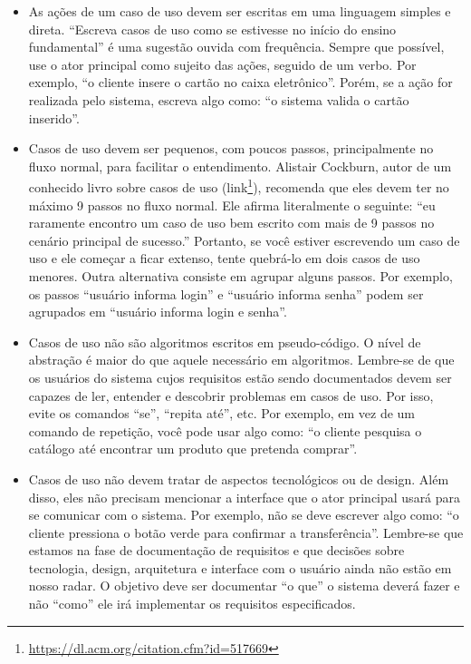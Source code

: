 \documentclass[
  11pt,
  twoside]{book}
\DeclareRobustCommand{\href}[2]{#2\footnote{\url{#1}}}
\begin{document}
\begin{itemize}
\item
  As ações de um caso de uso devem ser escritas em uma linguagem simples
  e direta. ``Escreva casos de uso como se estivesse no início do ensino
  fundamental'' é uma sugestão ouvida com frequência. Sempre que
  possível, use o ator principal como sujeito das ações, seguido de um
  verbo. Por exemplo, ``o cliente insere o cartão no caixa eletrônico''.
  Porém, se a ação for realizada pelo sistema, escreva algo como: ``o
  sistema valida o cartão inserido''.
\item
  Casos de uso devem ser pequenos, com poucos passos, principalmente no
  fluxo normal, para facilitar o entendimento. Alistair Cockburn,
   autor de um conhecido livro sobre casos de
  uso (\href{https://dl.acm.org/citation.cfm?id=517669}{link}),
  recomenda que eles devem ter no máximo 9 passos no fluxo normal. Ele
  afirma literalmente o seguinte: ``eu raramente encontro um caso de uso
  bem escrito com mais de 9 passos no cenário principal de sucesso.''
  Portanto, se você estiver escrevendo um caso de uso e ele começar a
  ficar extenso, tente quebrá-lo em dois casos de uso menores. Outra
  alternativa consiste em agrupar alguns passos. Por exemplo, os passos
  ``usuário informa login'' e ``usuário informa senha'' podem ser
  agrupados em ``usuário informa login e senha''.
\item
  Casos de uso não são algoritmos escritos em pseudo-código. O nível de
  abstração é maior do que aquele necessário em algoritmos. Lembre-se de
  que os usuários do sistema cujos requisitos estão sendo documentados
  devem ser capazes de ler, entender e descobrir problemas em casos de
  uso. Por isso, evite os comandos ``se'', ``repita até'', etc. Por
  exemplo, em vez de um comando de repetição, você pode usar algo como:
  ``o cliente pesquisa o catálogo até encontrar um produto que pretenda
  comprar''.
\item
  Casos de uso não devem tratar de aspectos tecnológicos ou de design.
  Além disso, eles não precisam mencionar a interface que o ator
  principal usará para se comunicar com o sistema. Por exemplo, não se
  deve escrever algo como: ``o cliente pressiona o botão verde para
  confirmar a transferência''. Lembre-se que estamos na fase de
  documentação de requisitos e que decisões sobre tecnologia, design,
  arquitetura e interface com o usuário ainda não estão em nosso radar.
  O objetivo deve ser documentar ``o que'' o sistema deverá fazer e não
  ``como'' ele irá implementar os requisitos especificados.

\end{itemize}
\end{document}
